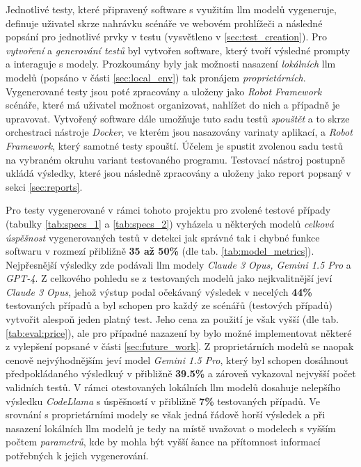 \documentclass[czech, ma, kiv, he, iso690numb, pdf, viewonly]{fasthesis}
\begin{document}
    Jednotlivé testy, které připravený software s využitím \Gls{llm} modelů vygeneruje, definuje uživatel skrze nahrávku scénáře ve webovém prohlížeči a následné popsání  pro jednotlivé prvky v testu (vysvětleno v \ref{sec:test_creation}). Pro \textit{vytvoření} a \textit{generování testů} byl vytvořen software, který tvoří výsledné prompty a interaguje s modely. Prozkoumány byly jak možnosti nasazení \textit{lokálních} \Gls{llm} modelů (popsáno v části \ref{sec:local_env}) tak pronájem \textit{proprietárních}. Vygenerované testy jsou poté zpracovány a uloženy jako \textit{Robot Framework} scénáře, které má uživatel možnost organizovat, nahlížet do nich a případně je upravovat. Vytvořený software dále umožňuje tuto sadu testů \textit{spouštět} a to skrze orchestraci nástroje \textit{Docker}, ve kterém jsou nasazovány varinaty aplikací, a \textit{Robot Framework}, který samotné testy spouští. Účelem je spustit zvolenou sadu testů na vybraném okruhu variant testovaného programu. Testovací nástroj postupně ukládá výsledky, které jsou následně zpracovány a uloženy jako report popsaný v sekci \ref{sec:reports}.

    Pro testy vygenerované v rámci tohoto projektu pro zvolené testové případy (tabulky \ref{tab:specs_1} a \ref{tab:specs_2}) vyházela u některých modelů \textit{celková úspěšnost} vygenerovaných testů v detekci jak správné tak i chybné funkce softwaru v rozmezí přibližně \textbf{35 až 50\%} (dle tab. \ref{tab:model_metrics}). Nejpřesnější výsledky zde podávali \Gls{llm} modely \textit{Claude 3 Opus, Gemini 1.5 Pro} a \textit{GPT-4}. Z celkového pohledu se z testovaných modelů jako nejkvalitnější jeví \textit{Claude 3 Opus}, jehož výstup podal očekávaný výsledek v necelých \textbf{44\%} testovaných případů a byl schopen pro každý ze scénářů (testových případů) vytvořit alespoň jeden platný test. Jeho cena za použití je však vyšší (dle tab. \ref{tab:eval:price}), ale pro případné nazazení by bylo možné implementovat některé z vylepšení popsané v části \ref{sec:future_work}. Z proprietárních modelů se naopak cenově nejvýhodnějším jeví model \textit{Gemini 1.5 Pro}, který byl schopen dosáhnout předpokládaného výsledkuý v přibližně \textbf{39.5\%} a zároveň vykazoval nejvyšší počet validních testů. V rámci otestovaných lokálních \Gls{llm} modelů dosahuje nelepšího výsledku \textit{CodeLlama} s úspěšností v přibližně \textbf{7\%} testovaných případů. Ve srovnání s proprietárními modely se však jedná řádově horší výsledek a při nasazení lokálních \Gls{llm} modelů je tedy na místě uvažovat o modelech s vyšším počtem \textit{parametrů}, kde by mohla být vyšší šance na přítomnost informací potřebných k jejich vygenerování.
\end{document}

